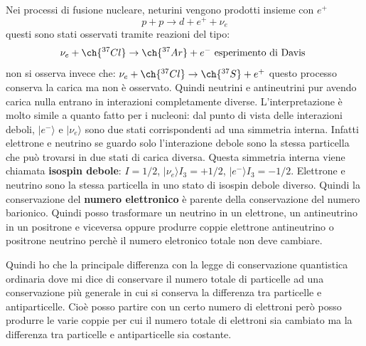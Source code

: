 Nei processi di fusione nucleare, neturini vengono prodotti insieme con $e^+$
\begin{equation*}
    p+p\to d+e^++\nu_e
\end{equation*}
questi sono stati osservati tramite reazioni del tipo:
\begin{equation*}
    \nu_e+\ch{^{37}Cl}\to\ch{^{37}Ar}+e^-\text{ esperimento di Davis }
\end{equation*}
non si osserva invece che: $\nu_e+\ch{^{37}Cl}\to\ch{^{37}S}+e^+$ questo processo conserva la carica ma non è osservato. Quindi neutrini e antineutrini pur avendo carica nulla entrano in interazioni completamente diverse. L'interpretazione è molto simile a quanto fatto per i nucleoni: dal punto di vista delle interazioni deboli, $|e^-\rangle$ e $|\nu_e\rangle$ sono due stati corrispondenti ad una simmetria interna. Infatti elettrone e neutrino se guardo solo l'interazione debole sono la stessa particella che può trovarsi in due stati di carica diversa. Questa simmetria interna viene chiamata \textbf{isospin debole}: $I=1/2$, $|\nu_e\rangle I_3=+1/2$, $|e^-\rangle I_3=-1/2$. Elettrone e neutrino sono la stessa particella in uno stato di isospin debole diverso. Quindi la conservazione del \textbf{numero elettronico} è parente della conservazione del numero barionico. Quindi posso trasformare un neutrino in un elettrone, un antineutrino in un positrone e viceversa oppure produrre coppie elettrone antineutrino o positrone neutrino perchè il numero eletronico totale non deve cambiare.

Quindi ho che la principale differenza con la legge di conservazione quantistica ordinaria dove mi dice di conservare il numero totale di particelle ad una conservazione più generale in cui si conserva la differenza tra particelle e antiparticelle. Cioè posso partire con un certo numero di elettroni però posso produrre le varie coppie per cui il numero totale di elettroni sia cambiato ma la differenza tra particelle e antiparticelle sia costante.
